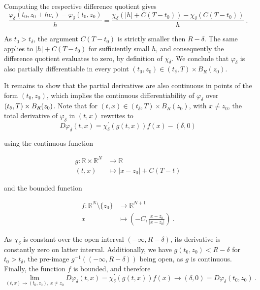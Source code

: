 Computing the respective difference quotient gives
\begin{equation*}
	\frac{\varphi_{\delta}(t_0, z_0 + h e_i) - \varphi_{\delta}(t_0, z_0)}{h} = \frac{\chi_{\delta}(\lvert h \rvert + C(T - t_0)) - \chi_{\delta}(C(T - t_0))}{h} \ .
\end{equation*}

As $ t_0 > t_{\delta} $, the argument $ C(T - t_0) $ is strictly smaller then $ R - \delta $. The same applies to $ \lvert h \rvert + C(T - t_0) $ for sufficiently small $ h $, and consequently the difference quotient evaluates to zero, by definition of $ \chi_{\delta} $. We conclude that $ \varphi_{\delta} $ is also partially differentiable in every point $ (t_0, z_0) \in \left(t_{\delta}, T \right) \times B_R (z_0) $.

It remains to show that the partial derivatives are also continuous in points of the form $ (t_0, z_0) $, which implies the continuous differentiability of $ \varphi_{\delta} $ over $ \left(t_{\delta}, T\right) \times B_R(z_0) $.
Note that for $ (t, x)  \in \left(t_{\delta}, T\right) \times B_R (z_0) $, with $ x \neq z_0 $, the total derivative of $ \varphi_{\delta} $ in $ (t, x) $ rewrites to
\begin{equation*}
	D \varphi_{\delta} (t, x) = \chi_{\delta}^{\prime}(g(t, x))f(x) - \left(\delta, 0 \right)
\end{equation*}

using the continuous function

\begin{align*}
	g : \mathbb{R} \times \mathbb{R}^N &\to \mathbb{R} \\
	(t, x) &\mapsto \lvert x - z_0 \rvert + C(T - t)
\end{align*}

and the bounded function

\begin{align*}
	f : \mathbb{R}^N \setminus \{ z_0 \} &\to \mathbb{R}^{N + 1} \\
	x &\mapsto \left(-C, \frac{x - z_0}{\lvert x - z_0 \rvert}\right) \ .
\end{align*}

As $ \chi_{\delta} $ is constant over the open interval $ \left(- \infty, R - \delta \right) $, its derivative is constantly zero on latter interval. Additionally, we have $ g(t_0, z_0) < R - \delta $ for $ t_0 > t_{\delta} $, the pre-image $ g^{-1}((-\infty, R - \delta)) $ being open, as $ g $ is continuous. Finally, the function $ f $ is bounded, and therefore
\begin{equation*}
	\lim\limits_{(t, x) \to (t_0, z_0), \ x \neq z_0} D \varphi_{\delta}(t, x) = \chi_{\delta}^{\prime}(g(t, x))f(x) \to \left(\delta, 0 \right) = D \varphi_{\delta}(t_0, z_0) \ .
\end{equation*}

